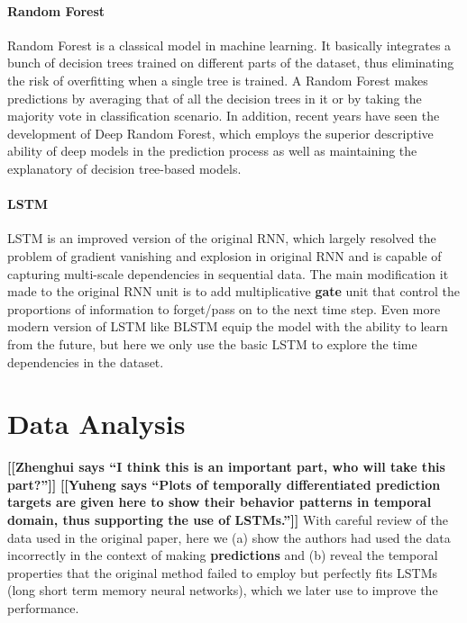 \documentclass[sigconf]{acmart}
\newcommand{\heng}[1]{{\bf \color{cyan} [[Yuheng says ``#1'']]}}
\newcommand{\hui}[1]{{\bf \color{purple} [[Zhenghui says ``#1'']]}}
\begin{document}
\paragraph{Random Forest} Random Forest is a classical model in machine learning. It basically integrates a bunch of decision trees trained on different parts of the dataset, thus eliminating the risk of overfitting when a single tree is trained. A Random Forest makes predictions by averaging that of all the decision trees in it or by taking the majority vote in classification scenario. In addition, recent years have seen the development of Deep Random Forest, which employs the superior descriptive ability of deep models in the prediction process as well as maintaining the explanatory of decision tree-based models.

\paragraph{LSTM} LSTM is an improved version of the original RNN, which largely resolved the problem of gradient vanishing and explosion in original RNN and is capable of capturing multi-scale dependencies in sequential data. The main modification it made to the original RNN unit is to add multiplicative \textbf{gate} unit that control the proportions of information to forget/pass on to the next time step. Even more modern version of LSTM like BLSTM equip the model with the ability to learn from the future, but here we only use the basic LSTM to explore the time dependencies in the dataset.

 

\section{Data Analysis}
 \label{sec:dataAna}
\hui{I think this is an important part, who will take this part?}
\heng{Plots of temporally differentiated prediction targets are given here to show their behavior patterns in temporal domain, thus supporting the use of LSTMs.}
With careful review of the data used in the original paper, here we (a) show the authors had used the data incorrectly in the context of making \textbf{predictions} and (b) reveal the temporal properties that the original method failed to employ but perfectly fits LSTMs (long short term memory neural networks), which we later use to improve the performance.
\end{document}
